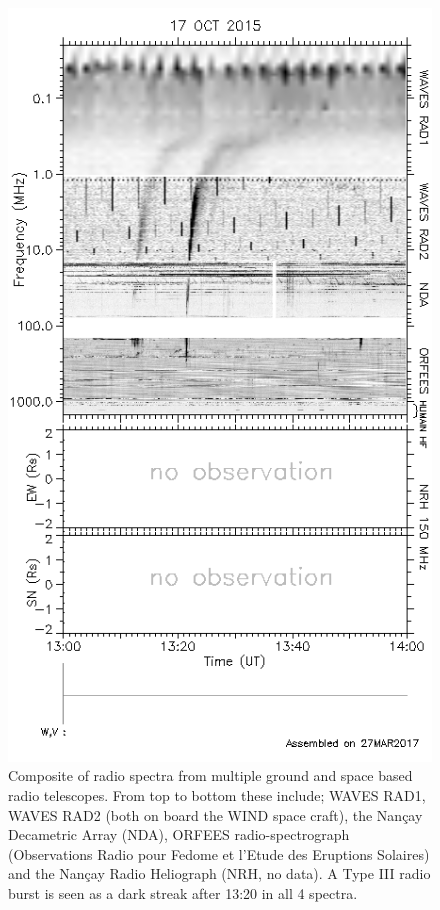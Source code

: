 \begin{figure}
    \centering
    \includegraphics[width=0.75\columnwidth]{Images/Radio_composite.png}
    \caption[Composite of radio spectra from multiple ground and space based radio telescopes.]{Composite of radio spectra from multiple ground and space based radio telescopes. From top to bottom these include; WAVES RAD1, WAVES RAD2 (both on board the WIND space craft), the Nan\c{c}ay Decametric Array (NDA), ORFEES radio-spectrograph (Observations Radio pour Fedome et l’Etude des Eruptions Solaires) and the Nan\c{c}ay Radio Heliograph (NRH, no data). A Type III radio burst is seen as a dark streak after 13:20 in all 4 spectra.}
    \label{fig:comp_spec}
\end{figure}







